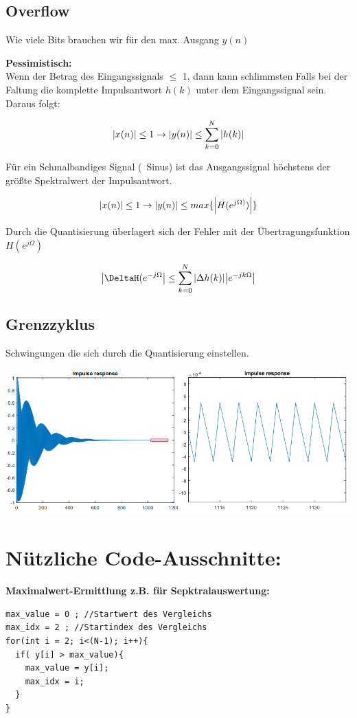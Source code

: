 \documentclass[10pt,a4paper]{article}
\begin{document}
\subsection{Overflow}
Wie viele Bits brauchen wir für den max. Ausgang $y(n)$

\textbf{Pessimistisch:}\\
Wenn der Betrag des Eingangssignals $\leq$ 1, dann kann schlimmsten Falls
bei der Faltung die komplette Impulsantwort $h(k)$ unter dem Eingangssignal sein. 
Daraus folgt:
  \begin{mdframed}[style=exercise]
    \begin{align}
        \abs{x(n)} \leq 1 \rightarrow \abs{y(n)} \leq \sum_{k=0}^N \abs{h(k)}
    \end{align}
  \end{mdframed}

Für ein Schmalbandiges Signal (~Sinus) ist das Ausgangssignal höchstens der größte Spektralwert der Impulsantwort.
  \begin{mdframed}[style=exercise]
    \begin{align}
        \abs{x(n)} \leq 1 \rightarrow \abs{y(n)} \leq max\{\abs{H(e^{j\Omega)})}\}
    \end{align}
  \end{mdframed}
  
Durch die Quantisierung überlagert sich der Fehler mit der Übertragungsfunktion $H(e^{j\Omega})$
  \begin{mdframed}[style=exercise]
    \begin{align}
        \abs{\DeltaH(e^{-j\Omega}} \leq  \sum_{k=0}^N \abs{ \Delta h(k) } \abs{ e^{-jk\Omega} }
    \end{align}
  \end{mdframed}



\subsection{Grenzzyklus}
Schwingungen die sich durch die Quantisierung einstellen.
\begin{center}
    \includegraphics[width=.4\textwidth]{./img/grenzzyklus.png}
\end{center}

\section{Nützliche Code-Ausschnitte:}
\textbf{Maximalwert-Ermittlung z.B. für Sepktralauswertung:}
\begin{verbatim}
max_value = 0 ; //Startwert des Vergleichs
max_idx = 2 ; //Startindex des Vergleichs
for(int i = 2; i<(N-1); i++){ 
  if( y[i] > max_value){
    max_value = y[i];
    max_idx = i;
  }
}
\end{verbatim}
\end{document}
